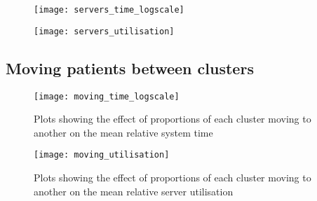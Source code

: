 \begin{figure}
    \centering
    \begin{minipage}{\halfimgwidth}
        \texttt{[image: servers\_time\_logscale]}
        \label{fig:servers_time}
    \end{minipage}\hfill%
    \begin{minipage}{\halfimgwidth}
        \texttt{[image: servers\_utilisation]}
        \label{fig:servers_utilisation}
\end{minipage}
\end{figure}

\subsection{Moving patients between clusters}\label{subsec:moving}

\begin{figure}
    \centering
    \texttt{[image: moving\_time\_logscale]}
    \caption{Plots showing the effect of proportions of each cluster moving to
    another on the mean relative system time}\label{fig:moving_time}
\end{figure}

\begin{figure}
    \centering
    \texttt{[image: moving\_utilisation]}
    \caption{Plots showing the effect of proportions of each cluster moving to
    another on the mean relative server
    utilisation}\label{fig:moving_utilisation}
\end{figure}
